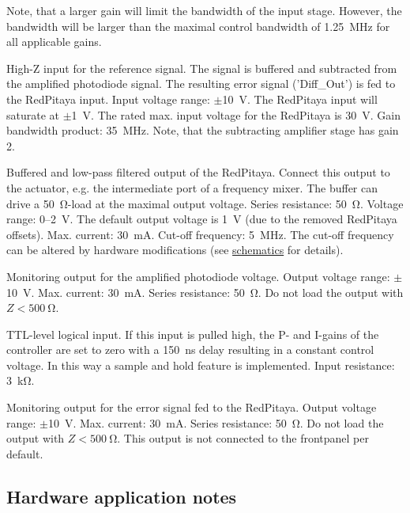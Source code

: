 \documentclass[twoside,a4paper]{refart}
\begin{document}
Note, that a larger gain will limit the bandwidth of the input stage. However, the bandwidth will be larger than the maximal control bandwidth of \SI{1.25}{\mega\hertz} for all applicable gains. 



High-Z input for the reference signal. The signal is buffered and subtracted from the amplified photodiode signal. The resulting error signal ('Diff\_Out') is fed to the RedPitaya input. Input voltage range:  $\pm$\SI{10}{\volt}. The RedPitaya input will saturate at $\pm$\SI{1}{\volt}. The rated max. input voltage for the RedPitaya is \SI{30}{\volt}. Gain bandwidth product: \SI{35}{\mega\hertz}. Note, that the subtracting amplifier stage has gain 2.

Buffered and low-pass filtered output of the RedPitaya. Connect this output to the actuator, e.g. the intermediate port of a frequency mixer. The buffer can drive a \SI{50}{\ohm}-load at the maximal output voltage. Series resistance: \SI{50}{\ohm}.  Voltage range: 0--\SI{2}{\volt}. The default output voltage is \SI{1}{\volt} (due to the removed RedPitaya offsets).  Max. current: \SI{30}{\milli\ampere}. Cut-off frequency: \SI{5}{\mega\hertz}. The cut-off frequency can be altered by hardware modifications (see \href{https://github.com/TU-Darmstadt-APQ/RedPitaya-IntStab/tree/master/pcb}{schematics} for details).

Monitoring output for the amplified photodiode voltage. Output voltage range: $\pm$\SI{10}{\volt}. Max. current: \SI{30}{\milli\ampere}. Series resistance: \SI{50}{\ohm}. Do not load the output with $Z < \SI{500}{\ohm}$.

TTL-level logical input. If this input is pulled high, the P- and I-gains of the controller are set to zero with a \SI{150}{\nano\second} delay resulting in a constant control voltage. In this way a sample and hold feature is implemented. Input resistance: \SI{3}{\kilo\ohm}.

 
Monitoring output for the error signal fed to the RedPitaya. Output voltage range: $\pm$\SI{10}{\volt}. Max. current: \SI{30}{\milli\ampere}. Series resistance: \SI{50}{\ohm}. Do not load the output with $Z < \SI{500}{\ohm}$. This output is not connected to the frontpanel per default.



\subsection{Hardware application notes \label{sec:app_note}}
\end{document}

